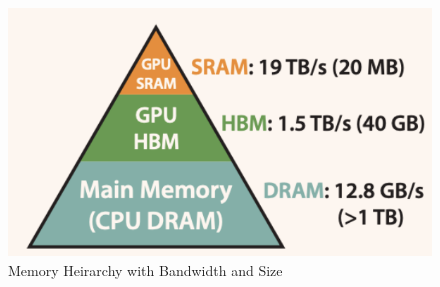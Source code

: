 \documentclass[12pt,a4paper]{report}
\begin{document}
\begin{figure}[ht]
    \centerline{\includegraphics[scale=0.6]{C4.1.3_GPU_Band.png}}
    \caption{Memory Heirarchy with Bandwidth and Size}
    \label{gpu-band}
\end{figure}
\end{document}
